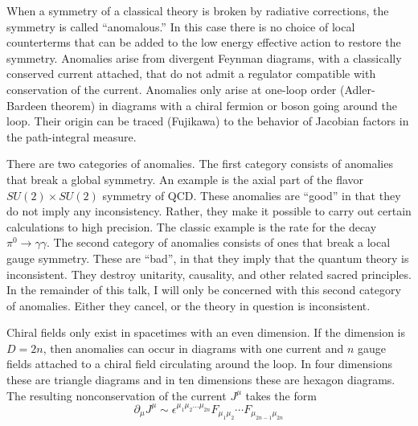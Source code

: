 \documentclass[a4paper,12pt]{article}
\begin{document}
When a symmetry of a classical theory is broken by radiative corrections,
the symmetry is called ``anomalous.'' In this case there is no
choice of local counterterms that can be added to the low energy
effective action to restore the symmetry. Anomalies arise from
divergent Feynman diagrams, with a classically conserved current
attached, that do not admit a regulator compatible with
conservation of the current. Anomalies only arise at one-loop
order (Adler-Bardeen theorem) in diagrams with a chiral fermion or
boson going around the loop. Their origin can be traced (Fujikawa)
to the behavior of Jacobian factors in the path-integral measure.

There are two categories of anomalies. The first category consists
of anomalies that break a global symmetry. An example is the axial
part of the flavor $SU(2) \times SU(2)$ symmetry of QCD.  These
anomalies are ``good'' in that they do not imply any
inconsistency. Rather, they make it possible to carry out certain
calculations to high precision. The classic example is the rate for
the decay $\pi^0 \to \gamma\gamma$. The second category of
anomalies consists of ones that break a local gauge symmetry.
These are ``bad'', in that they imply that the quantum theory is
inconsistent. They destroy unitarity, causality, and other related
sacred principles. In the remainder of this talk, I will only be
concerned with this second category of anomalies. Either they
cancel, or the theory in question is inconsistent.

Chiral fields only exist in spacetimes with an even dimension. If
the dimension is $D= 2n$, then anomalies can occur in diagrams
with one current and $n$ gauge fields attached to a chiral field
circulating around the loop. In four dimensions these are triangle
diagrams and in ten dimensions these are hexagon diagrams. The
resulting nonconservation of the current $J^{\mu}$ takes the form
\begin{equation}
\partial_{\mu} J^{\mu} \sim \epsilon^{\mu_1 \mu_2 \ldots \mu_{2n}}
F_{\mu_1 \mu_2}  \cdots
F_{\mu_{2n-1} \mu_{2n}}
\end{equation}
\end{document}
